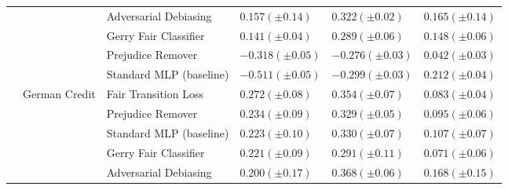 \begin{tabular}{llllll}
 &  & Adversarial Debiasing & $0.157 (\pm0.14)$ & $0.322 (\pm0.02)$ & $0.165 (\pm0.14)$ \\
 &  & Gerry Fair Classifier & $0.141 (\pm0.04)$ & $0.289 (\pm0.06)$ & $0.148 (\pm0.06)$ \\
 &  & Prejudice Remover & $-0.318 (\pm0.05)$ & $-0.276 (\pm0.03)$ & $0.042 (\pm0.03)$ \\
 &  & Standard MLP (baseline) & $-0.511 (\pm0.05)$ & $-0.299 (\pm0.03)$ & $0.212 (\pm0.04)$ \\
\cline{2-6}
 & \multirow[t]{5}{*}{German Credit} & Fair Transition Loss & $0.272 (\pm0.08)$ & $0.354 (\pm0.07)$ & $0.083 (\pm0.04)$ \\
 &  & Prejudice Remover & $0.234 (\pm0.09)$ & $0.329 (\pm0.05)$ & $0.095 (\pm0.06)$ \\
 &  & Standard MLP (baseline) & $0.223 (\pm0.10)$ & $0.330 (\pm0.07)$ & $0.107 (\pm0.07)$ \\
 &  & Gerry Fair Classifier & $0.221 (\pm0.09)$ & $0.291 (\pm0.11)$ & $0.071 (\pm0.06)$ \\
 &  & Adversarial Debiasing & $0.200 (\pm0.17)$ & $0.368 (\pm0.06)$ & $0.168 (\pm0.15)$ \\
\cline{1-6} \cline{2-6}
\bottomrule
\end{tabular}
